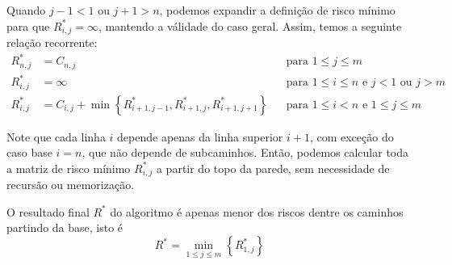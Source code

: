 Quando $j - 1 < 1$ ou $j + 1 > n$, podemos expandir a definição de risco mínimo para que $R^*_{i, j} = \infty$, mantendo a válidade do caso geral. Assim, temos a seguinte relação recorrente:
\begin{align*}
    R^*_{n, j} &= C_{n, j} && \text{para $1 \leq j \leq m$}\\
    R^*_{i, j} &= \infty && \text{para $1 \leq i \leq n$ e $j < 1$ ou $j > m$} \\
    R^*_{i, j} &= C_{i, j} + \min\left\{R^*_{i+1,j-1}, R^*_{i+1,j}, R^*_{i+1,j+1}\right\} && \text{para $1 \leq i < n$ e $1 \leq j \leq m$}
\end{align*}

Note que cada linha $i$ depende apenas da linha superior $i+1$, com exceção do caso base $i = n$, que não depende de subcaminhos. Então, podemos calcular toda a matriz de risco mínimo $R^*_{i, j}$ a partir do topo da parede, sem necessidade de recursão ou memorização.

O resultado final $R^*$ do algoritmo é apenas menor dos riscos dentre os caminhos partindo da base, isto é
\[
    R^* = \min_{1 \leq j \leq m}\left\{R^*_{1, j}\right\}
\]

